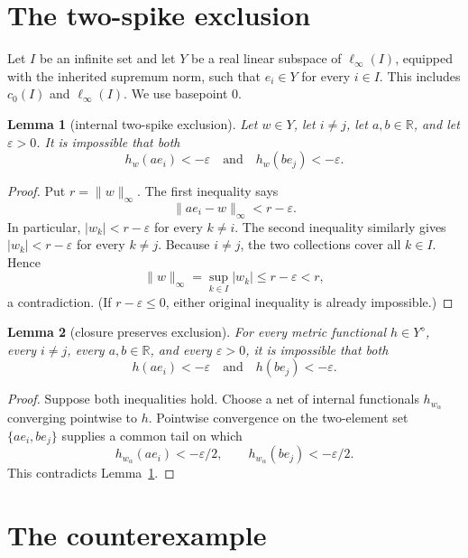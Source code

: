 \documentclass[11pt]{article}
\newtheorem{lemma}{Lemma}
\begin{document}
\section{The two-spike exclusion}

Let $I$ be an infinite set and let $Y$ be a real linear subspace of
$\ell_\infty(I)$, equipped with the inherited supremum norm, such that
$e_i\in Y$ for every $i\in I$.  This includes $c_0(I)$ and
$\ell_\infty(I)$.  We use basepoint $0$.

\begin{lemma}[internal two-spike exclusion]\label{lem:internal}
Let $w\in Y$, let $i\ne j$, let $a,b\in\mathbb R$, and let
$\varepsilon>0$.  It is impossible that both
\[
 h_w(ae_i)<-\varepsilon
 \quad\text{and}\quad
 h_w(be_j)<-\varepsilon.
\]
\end{lemma}

\begin{proof}
Put $r=\lVert w\rVert_\infty$.  The first inequality says
\[
 \lVert ae_i-w\rVert_\infty<r-\varepsilon.
\]
In particular, $|w_k|<r-\varepsilon$ for every $k\ne i$.  The second
inequality similarly gives $|w_k|<r-\varepsilon$ for every $k\ne j$.
Because $i\ne j$, the two collections cover all $k\in I$.  Hence
\[
 \lVert w\rVert_\infty=\sup_{k\in I}|w_k|\le r-\varepsilon<r,
\]
a contradiction.  (If $r-\varepsilon\le0$, either original inequality is
already impossible.)
\end{proof}

\begin{lemma}[closure preserves exclusion]\label{lem:closure}
For every metric functional $h\in Y^\diamond$, every $i\ne j$, every
$a,b\in\mathbb R$, and every $\varepsilon>0$, it is impossible that both
\[
 h(ae_i)<-\varepsilon
 \quad\text{and}\quad
 h(be_j)<-\varepsilon.
\]
\end{lemma}

\begin{proof}
Suppose both inequalities hold.  Choose a net of internal functionals
$h_{w_\alpha}$ converging pointwise to $h$.  Pointwise convergence on the
two-element set $\{ae_i,be_j\}$ supplies a common tail on which
\[
 h_{w_\alpha}(ae_i)<-\varepsilon/2,
 \qquad
 h_{w_\alpha}(be_j)<-\varepsilon/2.
\]
This contradicts Lemma~\ref{lem:internal}.
\end{proof}

\section{The counterexample}
\end{document}
